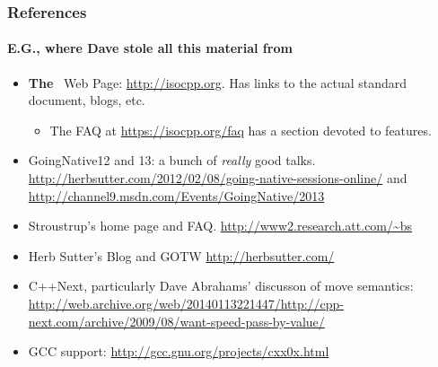 \begin{frame}[fragile]
\frametitle{ References}
\framesubtitle{E.G., where Dave stole all this material from}

\begin{itemize}
\item {\bf The} \CC\ Web Page: {\url{http://isocpp.org}}.  Has
      links to the actual standard document, blogs, etc.
      \begin{itemize}
      \item The FAQ at {\footnotesize \url{https://isocpp.org/faq}} has a section devoted to  features.
      \end{itemize}
\item GoingNative12 and 13: a bunch of \emph{really} good
      talks. {\footnotesize \url{http://herbsutter.com/2012/02/08/going-native-sessions-online/}} and
      {\footnotesize \url{http://channel9.msdn.com/Events/GoingNative/2013}}
\item Stroustrup's home page and FAQ. {\footnotesize \url{http://www2.research.att.com/~bs}}
\item Herb Sutter's Blog and GOTW {\footnotesize \url{http://herbsutter.com/}}
\item C++Next, particularly Dave Abrahams' discusson of move
semantics: {\footnotesize \url{http://web.archive.org/web/20140113221447/http://cpp-next.com/archive/2009/08/want-speed-pass-by-value/}}


\item GCC  support: {\footnotesize \url{http://gcc.gnu.org/projects/cxx0x.html}}


\end{itemize}


\end{frame}

